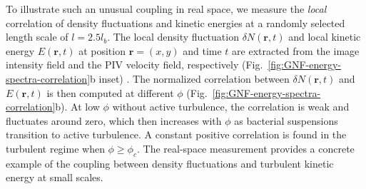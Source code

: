 \documentclass[twocolumn,aps,prx,amsmath,amssymb,longbibliography]{revtex4-2}
\begin{document}
To illustrate such an unusual coupling in real space, we measure the \emph{local} correlation of density fluctuations and kinetic energies at a randomly selected length scale of $l = 2.5l_b$. The local density fluctuation $\delta N(\mathbf{r},t)$ and local kinetic energy $E(\mathbf{r},t)$ at position $\mathbf{r} = (x,y)$ and time $t$ are extracted from the image intensity field and the PIV velocity field, respectively (Fig.~\ref{fig:GNF-energy-spectra-correlation}b inset) \cite{Liu2020}.
The normalized correlation between $\delta N(\mathbf{r},t)$ and $E(\mathbf{r},t)$ is then computed at different $\phi$ (Fig.~\ref{fig:GNF-energy-spectra-correlation}b). At low $\phi$ without active turbulence, the correlation is weak and fluctuates around zero, which then increases with $\phi$ as bacterial suspensions transition to active turbulence. A constant positive correlation is found in the turbulent regime when $\phi \geq \phi_c$. The real-space measurement provides a concrete example of the coupling between density fluctuations and turbulent kinetic energy at small scales.
\end{document}
